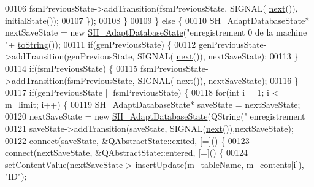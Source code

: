 \begin{DoxyCode}
00106                         fsmPreviousState->addTransition(fsmPreviousState, SIGNAL(
      \hyperlink{classSH__InOutStateMachine_aa9ee51efe0e17dcf5366c8a97b523892}{next}()), initialState());
00107                     \});
00108                 \}
00109             \} \textcolor{keywordflow}{else} \{
00110                 \hyperlink{classSH__AdaptDatabaseState}{SH\_AdaptDatabaseState}* nextSaveState = \textcolor{keyword}{new} 
      \hyperlink{classSH__AdaptDatabaseState}{SH\_AdaptDatabaseState}(\textcolor{stringliteral}{"enregistrement 0 de la machine "}+
      \hyperlink{classSH__InOutStateMachine_a60ecd7de03d948e2d1e9cbedb5c3e5fa}{toString}());
00111                 \textcolor{keywordflow}{if}(genPreviousState) \{
00112                     genPreviousState->addTransition(genPreviousState, SIGNAL(
      \hyperlink{classSH__InOutStateMachine_aa9ee51efe0e17dcf5366c8a97b523892}{next}()), nextSaveState);
00113                 \}
00114                 \textcolor{keywordflow}{if}(fsmPreviousState) \{
00115                     fsmPreviousState->addTransition(fsmPreviousState, SIGNAL(
      \hyperlink{classSH__InOutStateMachine_aa9ee51efe0e17dcf5366c8a97b523892}{next}()), nextSaveState);
00116                 \}
00117                 \textcolor{keywordflow}{if}(genPreviousState || fsmPreviousState) \{
00118                     \textcolor{keywordflow}{for}(\textcolor{keywordtype}{int} i = 1; i < \hyperlink{classSh__LoopingInOutStateMachine_a320ece6cf74c2667c70059b9421117fb}{m\_limit}; i++) \{
00119                         \hyperlink{classSH__AdaptDatabaseState}{SH\_AdaptDatabaseState}* saveState = nextSaveState;
00120                         nextSaveState = \textcolor{keyword}{new} \hyperlink{classSH__AdaptDatabaseState}{SH\_AdaptDatabaseState}(QString(\textcolor{stringliteral}{"
      enregistrement %
00121                         saveState->addTransition(saveState, SIGNAL(\hyperlink{classSH__InOutStateMachine_aa9ee51efe0e17dcf5366c8a97b523892}{next}()),nextSaveState);
00122                         connect(saveState, &QAbstractState::exited, [=]() \{
00123                             connect(nextSaveState, &QAbstractState::entered, [=]() \{
00124                                 \hyperlink{classSH__InOutStateMachine_aa2766b7a7ba39c35a10df7fc0c151b4f}{setContentValue}(nextSaveState->
      \hyperlink{classSH__AdaptDatabaseState_ab010e64da052db416328d3bcb9ca01d4}{insertUpdate}(\hyperlink{classSH__InOutStateMachine_acc0f5d5133af2dcca30939f53ec8837b}{m\_tableName}, \hyperlink{classSh__LoopingInOutStateMachine_a267e7cbcb3d6a137e2a4e1f93fb57e68}{m\_contents}[i]), \textcolor{stringliteral}{"ID"});
}
\end{DoxyCode}
